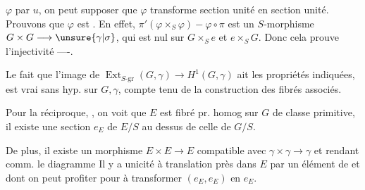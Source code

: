 $\varphi$ par $u$, on peut supposer que $\varphi$ transforme section unité en section unité. Prouvons que $\varphi$ est \uline{}. En effet, $\pi'(\varphi\times_S\varphi)-\varphi\circ\pi$ est un $S$-morphisme $G\times G\longrightarrow\unsure{\gamma|\sigma}$, qui est nul sur $G\times_S e$ et $e\times_S G$.
Donc cela prouve l'injectivité ----.

Le fait que l'image de $\operatorname{Ext}_{S\text{-gr}}(G,\gamma)\longrightarrow H^1(G,\gamma)$ ait les propriétés indiquées, est  vrai sans hyp. sur $G,\gamma$, compte tenu de la construction des fibrés associés.

Pour la réciproque, , on voit que  $E$ est fibré pr. homog sur $G$  de classe primitive, il existe  une section $e_E$ de $E/S$ au dessus de celle de $G/S$.


De plus, il existe un morphisme $E\times E\longrightarrow E$ compatible avec $\gamma\times\gamma\longrightarrow\gamma$ et rendant comm. le diagramme
Il y a unicité à translation près dans $E$ par un élément de \deleted{$\unsure{\gamma}$} et dont on peut profiter pour   à transformer $(e_E,e_E)$ en $e_E$.
